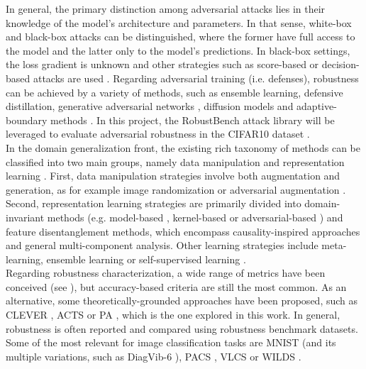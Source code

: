 In general, the primary distinction among adversarial attacks lies in
their knowledge of the model's architecture and parameters. In that
sense, white-box and black-box
attacks can be distinguished, where the former have full 
access to the model and the latter only 
to the model's predictions. In black-box settings, the loss gradient
is unknown and other strategies such as score-based or
decision-based attacks are used
\cite{liReviewAdversarialAttack2022}. Regarding adversarial training (i.e. defenses), 
robustness can
be achieved by a variety of methods, 
such as ensemble learning,
defensive distillation,
generative adversarial networks
\cite{xiaoGeneratingAdversarialExamples2019, miyatoVirtualAdversarialTraining2018},
diffusion models
\cite{wangBetterDiffusionModels2023,hoDenoisingDiffusionProbabilistic2020}
and adaptive-boundary methods
\cite{cohenCertifiedAdversarialRobustness2019}.
In this project, the RobustBench attack library
\cite{croceRobustBenchStandardizedAdversarial2021a}
will be leveraged to evaluate adversarial robustness 
in the CIFAR10 dataset
\cite{krizhevskyLearningMultipleLayers}. \\

In the domain generalization front, the existing rich taxonomy 
of methods can be classified into two main groups, namely
data manipulation and representation learning 
\cite{wangGeneralizingUnseenDomains2022,zhouDomainGeneralizationSurvey2022,liuOutOfDistributionGeneralizationSurvey2023}.
First, data manipulation strategies involve both augmentation and generation,
as for example image randomization or adversarial augmentation
\cite{yaoImprovingOutofDistributionRobustness2022,zhangMixupEmpiricalRisk2018,yunCutMixRegularizationStrategy2019}.
Second, representation learning strategies are primarily divided 
into domain-invariant methods (e.g. model-based
\cite{arjovskyInvariantRiskMinimization2020},
kernel-based
\cite{muandetDomainGeneralizationInvariant2013,arjovskyWassersteinGAN2017}
or adversarial-based
\cite{peiMultiAdversarialDomainAdaptation}) 
and feature disentanglement methods, which encompass causality-inspired
approaches and general multi-component analysis. Other 
learning strategies include meta-learning,
ensemble learning or self-supervised learning
\cite{liLearningGeneralizeMetaLearning2018,wangMetaFineTuningNeural2020}. \\

Regarding robustness characterization, a wide range of metrics
have been conceived (see
\cite{guoComprehensiveEvaluationFramework2023}), but
accuracy-based criteria are still the most common. As an alternative, 
some  theoretically-grounded approaches have been proposed, such
as CLEVER \cite{wengEvaluatingRobustnessNeural2018}, ACTS 
\cite{wangGeometricalApproachEvaluate2023}
or
PA
\cite{buhmannPosteriorAgreementModel2022}, 
which is the one explored in this work. 
In general, robustness is often reported and compared using 
robustness benchmark datasets. Some of the most relevant
for image classification tasks are 
MNIST 
\cite{lecun1998mnist}
(and its multiple variations, such as DiagVib-6
\cite{euligDiagViB6DiagnosticBenchmark2021}),
PACS
\cite{yuPACSDatasetPhysical2022},
VLCS
\cite{khoslaUndoingDamageDataset2012}
or WILDS
\cite{kohWILDSBenchmarkIntheWild2021}.

